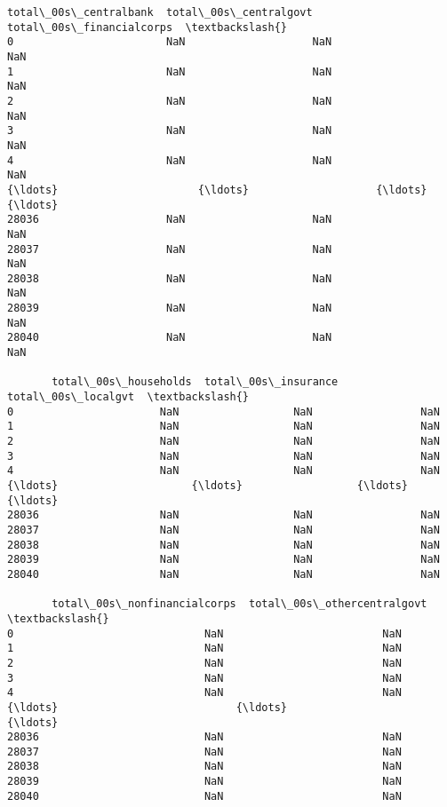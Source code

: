 \documentclass[11pt]{article}
\begin{document}
    \begin{Verbatim}[commandchars=\\\{\}]
       total\_00s\_centralbank  total\_00s\_centralgovt  total\_00s\_financialcorps  \textbackslash{}
0                        NaN                    NaN                       NaN
1                        NaN                    NaN                       NaN
2                        NaN                    NaN                       NaN
3                        NaN                    NaN                       NaN
4                        NaN                    NaN                       NaN
{\ldots}                      {\ldots}                    {\ldots}                       {\ldots}
28036                    NaN                    NaN                       NaN
28037                    NaN                    NaN                       NaN
28038                    NaN                    NaN                       NaN
28039                    NaN                    NaN                       NaN
28040                    NaN                    NaN                       NaN

       total\_00s\_households  total\_00s\_insurance  total\_00s\_localgvt  \textbackslash{}
0                       NaN                  NaN                 NaN
1                       NaN                  NaN                 NaN
2                       NaN                  NaN                 NaN
3                       NaN                  NaN                 NaN
4                       NaN                  NaN                 NaN
{\ldots}                     {\ldots}                  {\ldots}                 {\ldots}
28036                   NaN                  NaN                 NaN
28037                   NaN                  NaN                 NaN
28038                   NaN                  NaN                 NaN
28039                   NaN                  NaN                 NaN
28040                   NaN                  NaN                 NaN

       total\_00s\_nonfinancialcorps  total\_00s\_othercentralgovt  \textbackslash{}
0                              NaN                         NaN
1                              NaN                         NaN
2                              NaN                         NaN
3                              NaN                         NaN
4                              NaN                         NaN
{\ldots}                            {\ldots}                         {\ldots}
28036                          NaN                         NaN
28037                          NaN                         NaN
28038                          NaN                         NaN
28039                          NaN                         NaN
28040                          NaN                         NaN


\end{Verbatim}
\end{document}

